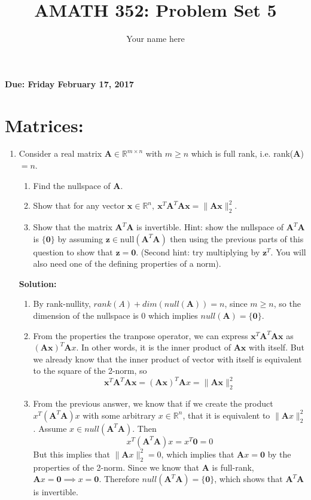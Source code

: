 \documentclass[]{article}
\title{AMATH 352: Problem Set 5}
\author{Your name here}
\newcommand{\R}{\mathbb{R}}				%
\newcommand{\x}{\bm{x}}					%
\newcommand{\A}{\bm{A}}					%
\newcommand{\solution}{\vskip 0.5cm \textbf{\large Solution:} \\}
\begin{document}
\maketitle
    {\Large \textbf{Due: Friday February 17, 2017}} \\


    \section*{Matrices:}
    \begin{enumerate}
	\item Consider a real matrix $\A\in\R^{m\times n}$ with $m\geq n$ which is full rank, i.e. rank($\A$)$=n$.
	  \begin{enumerate}
	  \item Find the nullspace of $\A$.
	  \item Show that for any vector $\x\in\R^n,~\x^T\A^T\A\x=\|\A\x\|^2_2$.
      \item Show that the matrix $\A^T\A$ is invertible. Hint: show the nullspace of $\A^T\A$ is $\{\bm{0}\}$ by assuming $\bm{z}\in\mathrm{null}(\A^T\A)$ then using the previous parts of this question to show that $\bm{z}=\bm{0}$. (Second hint: try multiplying by $\bm{z}^T$. You will also need one of the defining properties of a norm).
	  \end{enumerate}

	  \solution
	  \begin{enumerate}

      \item By rank-nullity, $rank(A) + dim(null(\A)) = n$, since $m
        \geq n$, so the dimension of the nullspace is 0 which implies
        $null(\A) = \{\bm{0}\}$.

	  \item From the properties the tranpose operator, we can express
        $\x^T\A^T\A\x$ as $(\A\x)^T\A x$. In other words, it is the
        inner product of $\A\x$ with itself. But we already know that
        the inner product of vector with itself is equivalent to the
        square of the 2-norm, so
        $$\x^T\A^T\A\x = (\A\x)^T\A x = \|\A\x\|^2_2$$

      \item From the previous answer, we know that if we create the
        product $x^T(\A^T\A)x$ with some arbitrary $x \in \R^n$, that
        it is equivalent to $\|\A x\|_2^2$. Assume $x \in
        null(\A^T\A)$. Then
        $$x^T(\A^T\A)x = x^T\bm{0} = 0$$ But this implies that $\|\A
        x\|_2^2 = 0$, which implies that $\A x = \bm{0}$ by the
        properties of the 2-norm. Since we know that $\A$ is
        full-rank, $\A x = \bm{0} \implies x = \bm{0}$. Therefore
        $null(\A^T\A) = \{ \bm{0} \}$, which shows that $\A^T\A$ is
        invertible.
        

\end{enumerate}
\end{enumerate}
\end{document}
